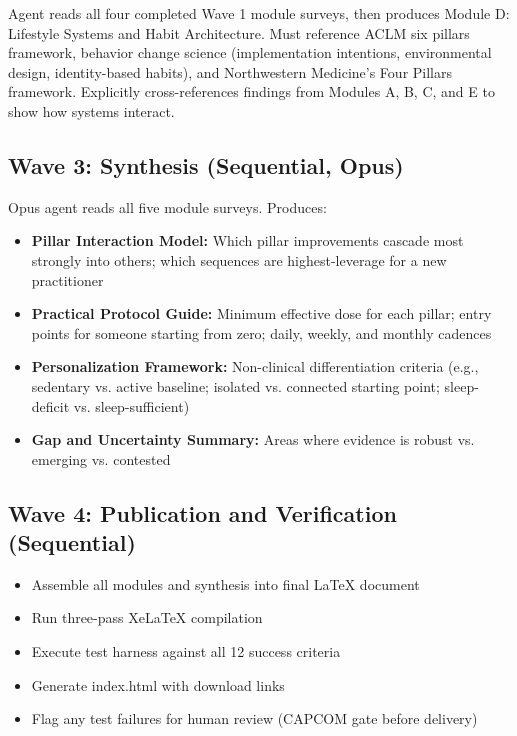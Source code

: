 \documentclass[11pt,letterpaper]{article}
\begin{document}
Agent reads all four completed Wave 1 module surveys, then produces Module D: Lifestyle Systems and Habit Architecture. Must reference ACLM six pillars framework, behavior change science (implementation intentions, environmental design, identity-based habits), and Northwestern Medicine's Four Pillars framework. Explicitly cross-references findings from Modules A, B, C, and E to show how systems interact.

\subsection{Wave 3: Synthesis (Sequential, Opus)}

Opus agent reads all five module surveys. Produces:
\begin{itemize}[leftmargin=1.5em]
  \item \textbf{Pillar Interaction Model:} Which pillar improvements cascade most strongly into others; which sequences are highest-leverage for a new practitioner
  \item \textbf{Practical Protocol Guide:} Minimum effective dose for each pillar; entry points for someone starting from zero; daily, weekly, and monthly cadences
  \item \textbf{Personalization Framework:} Non-clinical differentiation criteria (e.g., sedentary vs. active baseline; isolated vs. connected starting point; sleep-deficit vs. sleep-sufficient)
  \item \textbf{Gap and Uncertainty Summary:} Areas where evidence is robust vs. emerging vs. contested
\end{itemize}

\subsection{Wave 4: Publication and Verification (Sequential)}

\begin{itemize}[leftmargin=1.5em]
  \item Assemble all modules and synthesis into final LaTeX document
  \item Run three-pass XeLaTeX compilation
  \item Execute test harness against all 12 success criteria
  \item Generate index.html with download links
  \item Flag any test failures for human review (CAPCOM gate before delivery)
\end{itemize}
\end{document}
